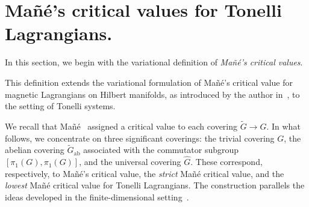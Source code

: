 \documentclass[11pt,reqno]{amsart}
\theoremstyle{plain}
\theoremstyle{definition}
\theoremstyle{plain} %
\theoremstyle{definition} %
\numberwithin{equation}{section}
\begin{document}
\section{Mañé's critical values for Tonelli Lagrangians.} \label{s: Mañé's critical values for Tonelli Lagrangians.}
In this section, we begin with the variational definition of
\emph{Mañé's critical values}. 

This definition extends the variational formulation of Mañé’s critical value 
for magnetic Lagrangians on Hilbert manifolds, as introduced by the author 
in~\cite{M24}, to the setting of Tonelli systems.

We recall that Mañé~\cite{Man} assigned a critical value to each covering 
$\tilde{G} \to G$.  
In what follows, we concentrate on three significant coverings: 
the trivial covering $G$, the abelian covering $\tilde{G}_{\mathrm{ab}}$ 
associated with the commutator subgroup $[\pi_1(G), \pi_1(G)]$, 
and the universal covering $\hat{G}$. 
These correspond, respectively, to 
Mañé’s critical value, 
the \emph{strict} Mañé critical value, 
and the \emph{lowest} Mañé critical value 
for Tonelli Lagrangians.  
The construction parallels the ideas developed in the finite-dimensional setting~\cite{Man, CIPP}. 
\end{document}
